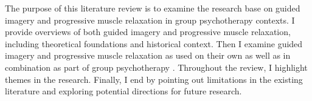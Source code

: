The purpose of this literature review is to examine the research base on guided imagery and progressive muscle relaxation in group psychotherapy contexts. I provide overviews of both guided imagery and progressive muscle relaxation, including theoretical foundations and historical context. Then I examine guided imagery and progressive muscle relaxation as used on their own as well as in combination as part of group psychotherapy \citep[see][for more]{baider1994progressive}. Throughout the review, I highlight themes in the research. Finally, I end by pointing out limitations in the existing literature and exploring potential directions for future research.
